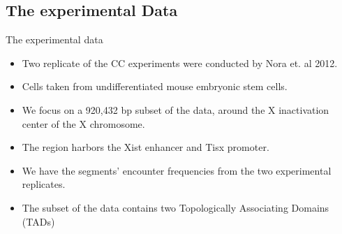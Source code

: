 \documentclass[8pt]{beamer}
\begin{document}
\subsection{The experimental Data}\label{subsection_theExperimentalData}
\begin{frame}{The experimental data}
\begin{itemize}
\item Two replicate of the CC experiments were conducted by Nora et. al 2012. 
\item Cells taken from undifferentiated mouse embryonic stem cells.
\item We focus on a 920,432 bp subset of the data, around the X inactivation center of the X chromosome. 
\item The region harbors the Xist enhancer and Tisx promoter.
\item We have the segments' encounter frequencies from the two experimental replicates.
\item The subset of the data contains two Topologically Associating Domains (TADs)
\end{itemize}
\end{frame}
\end{document}
